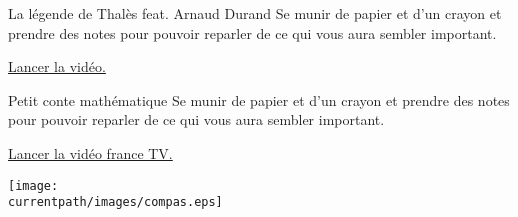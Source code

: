 

\hspace{1cm}

\begin{center}
    \begin{myBox}{La légende de Thalès feat. Arnaud Durand}
        Se munir de papier et d'un crayon et prendre des notes pour pouvoir reparler de ce qui vous aura sembler important.

        \bigskip
        
        \href{http://lozano.maths.free.fr/videos/la-legende-de-thales.mp4}{ Lancer la vidéo.}
    \end{myBox}

    \begin{myBox}{Petit conte mathématique}
        Se munir de papier et d'un crayon et prendre des notes pour pouvoir reparler de ce qui vous aura sembler important.

        \bigskip
        
        \href{http://lozano.maths.free.fr/videos/TheoremeThales.mp4}{ Lancer la vidéo france TV.}
    \end{myBox}
\end{center}

\hspace{1cm}

\begin{center}
    \texttt{[image: \\currentpath/images/compas.eps]}
\end{center}
